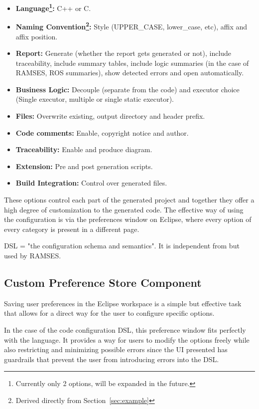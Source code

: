 \begin{itemize}  
	\item \textbf{Language\footnote{Currently only 2 options, will be expanded in the future.}: } C++ or C.
	\item \textbf{Naming Convention\footnote{Derived directly from Section~\ref{sec:example}}: } Style (UPPER\_CASE, lower\_case, etc), affix and affix position.
	\item \textbf{Report: } Generate (whether the report gets generated or not), include traceability, include summary tables, include logic summaries (in the case of \gls{RAMSES}, \gls{ROS} summaries), show detected errors and open automatically.
	\item \textbf{Business Logic: } Decouple (separate from the code) and executor choice (Single executor, multiple or single static executor).
	\item \textbf{Files: } Overwrite existing, output directory and header prefix.
	\item \textbf{Code comments: } Enable, copyright notice and author.
	\item \textbf{Traceability: } Enable and produce diagram.
	\item \textbf{Extension: } Pre and post generation scripts.
	\item \textbf{Build Integration: } Control over generated files.
\end{itemize}

These options control each part of the generated project and together they offer a high degree of customization to the generated code. The effective way of using the configuration is via the preferences window on Eclipse, where every option of every category is present in a different page.


\begin{tcolorbox}[colback=green!5, colframe=green!40!black] DSL = "the configuration schema and semantics".  
It is independent from but used by \gls{RAMSES}. \end{tcolorbox}


\subsection{Custom Preference Store Component}
\label{sec:dsl_custom}

Saving user preferences in the Eclipse workspace is a simple but effective task that allows for a direct way for the user to configure specific options.

In the case of the code configuration \gls{DSL}, this preference window fits perfectly with the language. It provides a way for users to modify the options freely while also restricting and minimizing possible errors since the \gls{UI} presented has guardrails that prevent the user from introducing errors into the \gls{DSL}.

